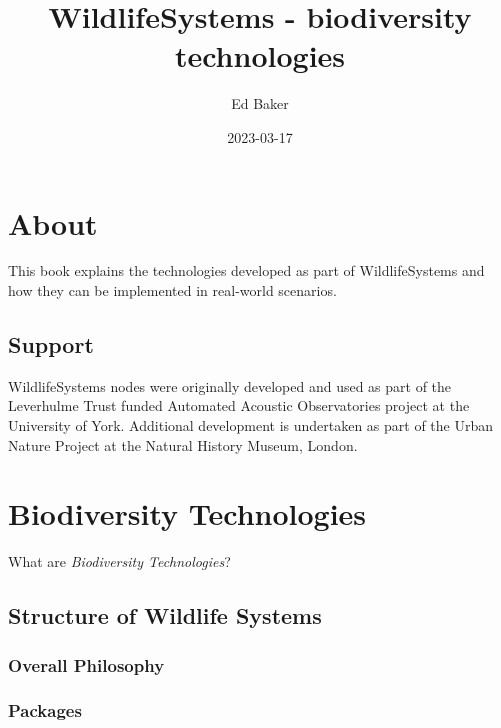 \documentclass[
]{book}
\title{WildlifeSystems - biodiversity technologies}
\author{Ed Baker}
\date{2023-03-17}
\begin{document}
\maketitle

{
\setcounter{tocdepth}{1}
\tableofcontents
}
\hypertarget{about}{%
\chapter*{About}\label{about}}

This book explains the technologies developed as part of WildlifeSystems and how they can be implemented in real-world scenarios.

\hypertarget{support}{%
\section*{Support}\label{support}}

WildlifeSystems nodes were originally developed and used as part of the Leverhulme Trust funded Automated Acoustic Observatories project at the University of York. Additional development is undertaken as part of the Urban Nature Project at the Natural History Museum, London.

\hypertarget{biodiversity-technologies}{%
\chapter{Biodiversity Technologies}\label{biodiversity-technologies}}

What are \emph{Biodiversity Technologies}?

\hypertarget{structure-of-wildlife-systems}{%
\section{Structure of Wildlife Systems}\label{structure-of-wildlife-systems}}

\hypertarget{overall-philosophy}{%
\subsection{Overall Philosophy}\label{overall-philosophy}}

\hypertarget{packages}{%
\subsection{Packages}\label{packages}}
\end{document}
